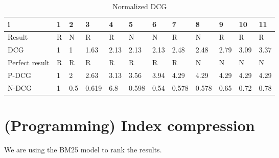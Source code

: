 \documentclass{scrartcl}
\begin{document}
\begin{table}[h]
\centering
\caption{Normalized DCG}
\begin{tabular}{|l|l|l|l|l|l|l|l|l|l|l|l|}
\hline
i              & 1 & 2   & 3     & 4    & 5     & 6    & 7     & 8     & 9    & 10   & 11   \\ \hline
Result         & R & N   & R     & R    & N     & N    & R     & N     & R    & R    & R    \\ \hline
DCG            & 1 & 1   & 1.63  & 2.13 & 2.13  & 2.13 & 2.48  & 2.48  & 2.79 & 3.09 & 3.37 \\ \hline
Perfect result & R & R   & R     & R    & R     & R    & R     & N     & N    & N    & N    \\ \hline
P-DCG          & 1 & 2   & 2.63  & 3.13 & 3.56  & 3.94 & 4.29  & 4.29  & 4.29 & 4.29 & 4.29 \\ \hline
N-DCG          & 1 & 0.5 & 0.619 & 6.8  & 0.598 & 0.54 & 0.578 & 0.578 & 0.65 & 0.72 & 0.78 \\ \hline
\end{tabular}
\end{table}




\section{(Programming) Index compression
}

We are using the BM25 model to rank the results.
\end{document}
